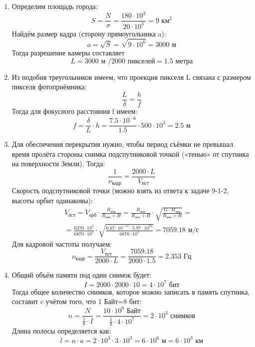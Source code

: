 \solutionSection

\begin{enumerate}
    \item Определим площадь города:
    $$S=\frac{N}{\sigma}=\frac{180\cdot10^3}{20\cdot10^3}=9\text{ км}^2$$
    Найдём размер кадра (сторону прямоугольника a):
    $$a=\sqrt S=\sqrt{9\cdot10^6}=3000\text{ м}$$
    Тогда разрешение камеры составляет
    $$L=3000\text{ м }/2000\text{ пикселей} = 1.5\text{ метра}$$
    
    \item Из подобия треугольников имеем, что проекция пикселя L связана с размером пикселя фотоприёмника:
    $$\frac{L}{\delta}=\frac{h}{f}$$
    Тогда для фокусного расстояния f имеем:
    $$f=\frac{\delta}{L}\cdot h=\frac{7.5\cdot10^{-6}}{1.5}\cdot500\cdot10^3=2.5\text{ м}$$
    
    \item Для обеспечения перекрытия нужно, чтобы период съёмки не превышал время пролёта стороны снимка подспутниковой точкой («тенью» от спутника на поверхности Земли). Тогда:
    $$\frac{1}{\nu_\text{кадр}}=\frac{2000\cdot L}{V_\text{пст}}$$
    Скорость подспутниковой точки (можно взять из ответа к задаче 9-1-2, высоты орбит одинаковы):
    \begin{eqnarray}\nonumber
    V_\text{пст}=V_\text{орб}\cdot\frac{R_\text{зем}}{R_\text{зем}+H}=\frac{R_\text{зем}}{R_\text{зем}+H}\cdot\sqrt{\frac{G\cdot M_\text{зем}}{R_\text{зем}+H}}=
    \\\nonumber
    =\frac{6370\cdot10^3}{6870\cdot10^3}\cdot\sqrt{\frac{6.67\cdot10^{-11}\cdot5.97\cdot10^{24}}{6870\cdot10^3}}=7059.18\text{ м/с}
    \end{eqnarray}
    Для кадровой частоты получаем:
    $$\nu_\text{кадр}=\frac{V_\text{пст}}{2000\cdot L}=\frac{7059.18}{2000\cdot1.5}=2.353\text{ Гц}$$
    
    \item Общий объём памяти под один снимок будет:
    $$I=2000\cdot2000\cdot10=4\cdot10^7\text{ бит}$$
    Тогда общее количество снимков, которое можно записать в память спутника, составит c учётом того, что  1 Байт=8 бит:
    $$n=\frac{N}{\frac{1}{8}\cdot I}=\frac{10\cdot10^9\text{ Байт}}{\frac{1}{8}\cdot4\cdot10^7}=2\cdot10^3\text{ снимков}$$
    Длина полосы определяется как:
    $$l=n\cdot a=2\cdot10^3\cdot3\cdot10^3=6\cdot10^6\text{ м}=6\cdot10^3\text{ км}$$ 
    

\end{enumerate}
